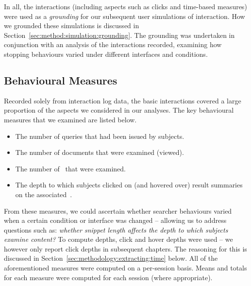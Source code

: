 In all, the interactions (including aspects such as clicks and time-based measures) were used as a \emph{grounding} for our subsequent user simulations of interaction. How we grounded these simulations is discussed in Section~\ref{sec:method:simulation:grounding}. The grounding was undertaken in conjunction with an analysis of the interactions recorded, examining how stopping behaviours varied under different interfaces and conditions.

\vspace*{-3mm}
\subsection{Behavioural Measures}
Recorded solely from interaction log data, the basic interactions covered a large proportion of the aspects we considered in our analyses. The key behavioural measures that we examined are listed below.

\begin{itemize}
    \item{ The number of queries that had been issued by subjects.}
    \item{ The number of documents that were examined (viewed).}
    \item{ The number of~ that were examined.}
    \item{ The depth to which subjects clicked on (and hovered over) result summaries on the associated~.}
\end{itemize}

From these measures, we could ascertain whether searcher behaviours varied when a certain condition or interface was changed -- allowing us to address questions such as: \emph{whether snippet length affects the depth to which subjects examine content?} To compute depths, click and hover depths were used -- we however only report click depths in subsequent chapters. The reasoning for this is discussed in Section~\ref{sec:methodology:extracting:time} below. All of the aforementioned measures were computed on a per-session basis. Means and totals for each measure were computed for each session (where appropriate).


